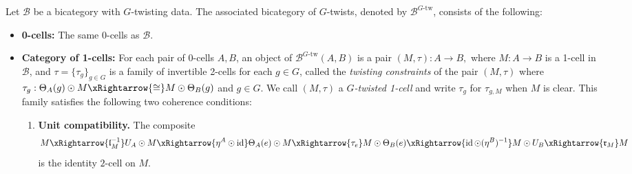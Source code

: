 \documentclass[11pt,oneside]{amsart}
\DeclareMathOperator{\id}{id}
\numberwithin{equation}{section}
\numberwithin{figure}{section}
\theoremstyle{plain}
\theoremstyle{definition}
\theoremstyle{remark}
\begin{document}
\begin{definition}\label{def:bicat_of_G_twists}
Let $\mathcal{B}$ be a bicategory with $G$-twisting data. The associated bicategory of $G$-twists, denoted by $\mathcal{B}^{G\text{-tw}}$, consists of the following:
\begin{itemize}
    \item \textbf{0-cells:} The same 0-cells as $\mathcal{B}$.

  \item \textbf{Category of 1-cells:} 
  For each pair of 0-cells $A,B$, an object of
$\mathcal B^{G\text{-tw}}(A,B)$ is a pair
\((M,\tau):A\to B,
\)
where $M:A\to B$ is a 1-cell in $\mathcal B$, and
\(
    \tau=\{\tau_{g}\}_{g\in G}
\)
is a family of invertible 2-cells for each $g \in G$, called the \emph{twisting constraints} of the pair \((M,\tau)\) where
\(
\tau_{g}:\Theta_A(g)\odot M \xRightarrow{\cong} M\odot \Theta_B(g)
\)  and \(g\in G\).
We call \((M,\tau)\)  a \emph{$G$-twisted 1-cell} and  write $\tau_g$ for $\tau_{g,M}$ when $M$ is clear. This family
    satisfies the following two coherence conditions:
    \begin{enumerate}
        \item[(a)] \textbf{Unit compatibility.} The composite
        \[ M \xRightarrow{\mathfrak{l}_M^{-1}} U_A \odot M \xRightarrow{\eta^A \odot \id} \Theta_A(e) \odot M \xRightarrow{\tau_e} M \odot \Theta_B(e) \xRightarrow{\id \odot (\eta^B)^{-1}} M \odot U_B \xRightarrow{\mathfrak{r}_M} M \]
        is the identity $2$-cell on $M$.
       

\end{enumerate}
\end{itemize}
\end{definition}
\end{document}
